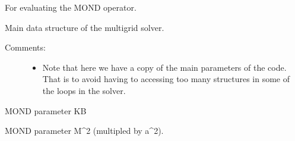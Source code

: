 \documentclass[letterpaper,10pt,english]{sphinxmanual}
\begin{document}

\begin{fulllineitems}
\label{\detokenize{sphinx-c-apidoc/output/gravity/mond_mass/solve_multigrid_mm_h:c.Z}}%
\pysigstartmultiline
{}%
\pysigstopmultiline
For evaluating the MOND operator.

\end{fulllineitems}


\begin{fulllineitems}
\label{\detokenize{sphinx-c-apidoc/output/gravity/mond_mass/solve_multigrid_mm_h:c.grids_gravity_mm}}%
\pysigstartmultiline
{}%
\pysigstopmultiline
Main data structure of the multigrid solver.
\begin{description}
\item[{Comments:}] \leavevmode\begin{itemize}
\item {} 
Note that here we have a copy of the main parameters of the code.
That is to avoid having to accessing too many structures in some of the
loops in the solver.

\end{itemize}

\end{description}

\begin{fulllineitems}
\label{\detokenize{sphinx-c-apidoc/output/gravity/mond_mass/solve_multigrid_mm_h:c.grids_gravity_mm.KB}}%
\pysigstartmultiline
{}%
\pysigstopmultiline
MOND parameter KB

\end{fulllineitems}


\begin{fulllineitems}
\label{\detokenize{sphinx-c-apidoc/output/gravity/mond_mass/solve_multigrid_mm_h:c.grids_gravity_mm.a2M2}}%
\pysigstartmultiline
{}%
\pysigstopmultiline
MOND parameter M\textasciicircum{}2 (multipled by a\textasciicircum{}2).


\end{fulllineitems}
\end{fulllineitems}
\end{document}
